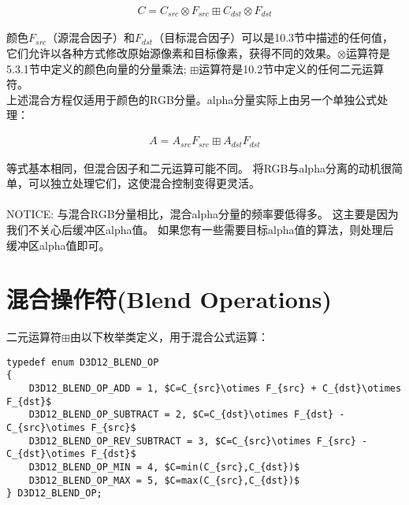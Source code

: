\begin{align*}
C=C_{src}\otimes F_{src}\boxplus C_{dst}\otimes F_{dst}
\end{align*}

\begin{flushleft}
颜色$F_{src}$（源混合因子）和$F_{dst}$（目标混合因子）可以是10.3节中描述的任何值，它们允许以各种方式修改原始源像素和目标像素，获得不同的效果。$\otimes$运算符是5.3.1节中定义的颜色向量的分量乘法; $\boxplus$运算符是10.2节中定义的任何二元运算符。\\

上述混合方程仅适用于颜色的RGB分量。alpha分量实际上由另一个单独公式处理：\\
\end{flushleft}

\begin{align*}
A=A_{src}F_{src}\boxplus A_{dst}F_{dst}
\end{align*}

\begin{flushleft}
等式基本相同，但混合因子和二元运算可能不同。 将RGB与alpha分离的动机很简单，可以独立处理它们，这使混合控制变得更灵活。\\
~\\
NOTICE: 与混合RGB分量相比，混合alpha分量的频率要低得多。 这主要是因为我们不关心后缓冲区alpha值。 如果您有一些需要目标alpha值的算法，则处理后缓冲区alpha值即可。
~\\
\end{flushleft}

\section{混合操作符(Blend Operations)}
\begin{flushleft}
二元运算符$\boxplus$由以下枚举类定义，用于混合公式运算：\\
\end{flushleft}

\begin{lstlisting}[mathescape]
typedef enum D3D12_BLEND_OP
{
    D3D12_BLEND_OP_ADD = 1, $C=C_{src}\otimes F_{src} + C_{dst}\otimes F_{dst}$
    D3D12_BLEND_OP_SUBTRACT = 2, $C=C_{dst}\otimes F_{dst} - C_{src}\otimes F_{src}$
    D3D12_BLEND_OP_REV_SUBTRACT = 3, $C=C_{src}\otimes F_{src} - C_{dst}\otimes F_{dst}$
    D3D12_BLEND_OP_MIN = 4, $C=min(C_{src},C_{dst})$
    D3D12_BLEND_OP_MAX = 5, $C=max(C_{src},C_{dst})$
} D3D12_BLEND_OP;
\end{lstlisting}

